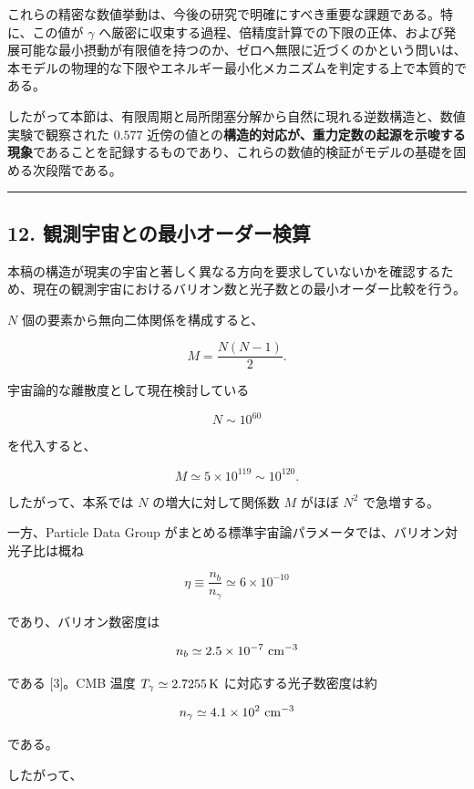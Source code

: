 \documentclass[
  a4paper,
]{ltjsarticle}
\begin{document}
これらの精密な数値挙動は、今後の研究で明確にすべき重要な課題である。特に、この値が
\(\gamma\)
へ厳密に収束する過程、倍精度計算での下限の正体、および発展可能な最小摂動が有限値を持つのか、ゼロへ無限に近づくのかという問いは、本モデルの物理的な下限やエネルギー最小化メカニズムを判定する上で本質的である。

したがって本節は、有限周期と局所閉塞分解から自然に現れる逆数構造と、数値実験で観察された
\(0.577\)
近傍の値との\textbf{構造的対応が、重力定数の起源を示唆する現象}であることを記録するものであり、これらの数値的検証がモデルの基礎を固める次段階である。

\begin{center}\rule{0.5\linewidth}{0.5pt}\end{center}

\subsection{12.
観測宇宙との最小オーダー検算}\label{ux89b3ux6e2cux5b87ux5b99ux3068ux306eux6700ux5c0fux30aaux30fcux30c0ux30fcux691cux7b97}

本稿の構造が現実の宇宙と著しく異なる方向を要求していないかを確認するため、現在の観測宇宙におけるバリオン数と光子数との最小オーダー比較を行う。

\(N\) 個の要素から無向二体関係を構成すると、

\[
M
=
\frac{N(N-1)}{2}.
\tag{19}
\]

宇宙論的な離散度として現在検討している

\[
N\sim10^{60}
\]

を代入すると、

\[
M
\simeq
5\times10^{119}
\sim10^{120}.
\tag{20}
\]

したがって、本系では \(N\) の増大に対して関係数 \(M\) がほぼ \(N^2\)
で急増する。

一方、Particle Data Group
がまとめる標準宇宙論パラメータでは、バリオン対光子比は概ね

\[
\eta
\equiv
\frac{n_b}{n_\gamma}
\simeq
6\times10^{-10}
\tag{21}
\]

であり、バリオン数密度は

\[
n_b
\simeq
2.5\times10^{-7}\ {\rm cm}^{-3}
\]

である {[}3{]}。CMB 温度 \(T_\gamma\simeq2.7255\,{\rm K}\)
に対応する光子数密度は約

\[
n_\gamma
\simeq
4.1\times10^2\ {\rm cm}^{-3}
\]

である。

したがって、
\end{document}
